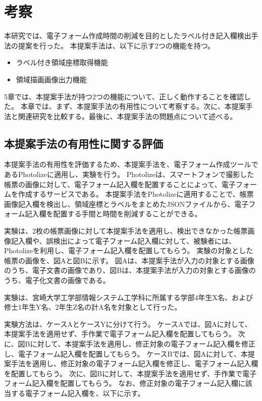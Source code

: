 \chapter{考察}\label{cha:Discussion}
本研究では、電子フォーム作成時間の削減を目的としたラベル付き記入欄検出手法の提案を行った。
本提案手法は、以下に示す2つの機能を持つ。

\begin{itemize}
  \item ラベル付き領域座標取得機能
  \item 領域描画画像出力機能
\end{itemize}

5章では、本提案手法が持つ2つの機能について、正しく動作することを確認した。
本章では、まず、本提案手法の有用性について考察する。次に、本提案手法と関連研究を比較する。最後に、本提案手法の問題点について述べる。

\section{本提案手法の有用性に関する評価}\label{sec:evalue_usefulness}
本提案手法の有用性を評価するため、本提案手法を、電子フォーム作成ツールであるPhotolizeに適用し、実験を行う。
Photolizeは、スマートフォンで撮影した帳票の画像に対して、電子フォーム記入欄を配置することによって、電子フォームを作成するサービスである\cite{Photolize}。
本提案手法をPhotolizeに適用することで、帳票画像記入欄を検出し、領域座標とラベルをまとめたJSONファイルから、電子フォーム記入欄を配置する手間と時間を削減することができる。

実験は、2枚の帳票画像に対して本提案手法を適用し、検出できなかった帳票画像記入欄や、誤検出によって電子フォーム記入欄に対して、被験者には、Photolizeを利用し、電子フォーム記入欄を配置してもらう。
実験の対象とした帳票の画像を、図Aと図Bに示す。
図Aは、本提案手法が入力の対象とする画像のうち、電子文書の画像であり、図Bは、本提案手法が入力の対象とする画像のうち、電子化文書の画像である。

実験は、宮崎大学工学部情報システム工学科に所属する学部4年生X名、および修士1年生Y名、2年生Z名の計A名を対象として行った。

実験方法は、ケースAとケースYに分けて行う。
ケースAでは、図Aに対して、本提案手法を適用せず、手作業で電子フォーム記入欄を配置してもらう。
次に、図Bに対して、本提案手法を適用し、修正対象の電子フォーム記入欄を修正し、電子フォーム記入欄を配置してもらう。
ケースBでは、図Aに対して、本提案手法を適用し、修正対象の電子フォーム記入欄を修正し、電子フォーム記入欄を配置してもらう。
次に、図Bに対して、本提案手法を適用せず、手作業で電子フォーム記入欄を配置してもらう。
なお、修正対象の電子フォーム記入欄に該当する電子フォーム記入欄を、以下に示す。

